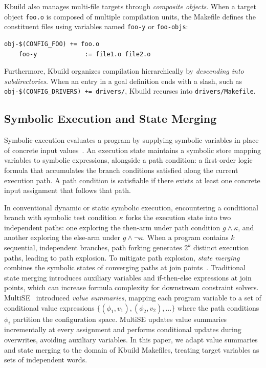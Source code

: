 \documentclass[acmsmall,screen,review,anonymous,nonacm]{acmart}
\begin{document}
    Kbuild also manages multi-file targets through \emph{composite objects}.
    When a target object \texttt{foo.o} is composed of multiple compilation units, the Makefile defines the constituent files using variables named \texttt{foo-y} or \texttt{foo-objs}:
    \begin{lstlisting}[style=kbuild]
    obj-$(CONFIG_FOO) += foo.o
    foo-y             := file1.o file2.o
    \end{lstlisting}
    Furthermore, Kbuild organizes compilation hierarchically by \emph{descending into subdirectories}.
    When an entry in a goal definition ends with a slash, such as \texttt{obj-\$(CONFIG\_DRIVERS) += drivers/}, Kbuild recurses into \texttt{drivers/Makefile}.

  \subsection{Symbolic Execution and State Merging}
    \label{sec:background:symex}
    Symbolic execution evaluates a program by supplying symbolic variables in place of concrete input values~\cite{king1976symbolic}.
    An execution state maintains a symbolic store mapping variables to symbolic expressions, alongside a path condition: a first-order logic formula that accumulates the branch conditions satisfied along the current execution path.
    A path condition is satisfiable if there exists at least one concrete input assignment that follows that path.

    In conventional dynamic or static symbolic execution, encountering a conditional branch with symbolic test condition $\kappa$ forks the execution state into two independent paths: one exploring the then-arm under path condition $g \land \kappa$, and another exploring the else-arm under $g \land \neg\kappa$.
    When a program contains $k$ sequential, independent branches, path forking generates $2^k$ distinct execution paths, leading to path explosion.
    To mitigate path explosion, \emph{state merging} combines the symbolic states of converging paths at join points~\cite{kuznetsov2012efficient,avgerinos2014enhancing}.
    Traditional state merging introduces auxiliary variables and if-then-else expressions at join points, which can increase formula complexity for downstream constraint solvers.
    MultiSE~\cite{sen2015multise} introduced \emph{value summaries}, mapping each program variable to a set of conditional value expressions $\{(\phi_1, v_1), (\phi_2, v_2), \dots\}$ where the path conditions $\phi_i$ partition the configuration space.
    MultiSE updates value summaries incrementally at every assignment and performs conditional updates during overwrites, avoiding auxiliary variables.
    In this paper, we adapt value summaries and state merging to the domain of Kbuild Makefiles, treating target variables as sets of independent words.
\end{document}
